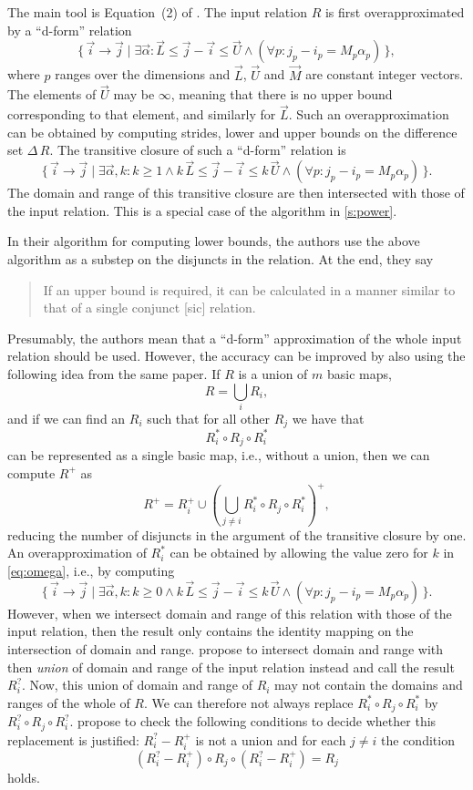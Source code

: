 The main tool is Equation~(2) of .
The input relation $R$ is first overapproximated by a ``d-form'' relation
$$
\{\, \vec i \to \vec j \mid \exists \vec \alpha :
\vec L \le \vec j - \vec i \le \vec U
\wedge
(\forall p : j_p - i_p = M_p \alpha_p)
\,\}
,
$$
where $p$ ranges over the dimensions and $\vec L$, $\vec U$ and
$\vec M$ are constant integer vectors.  The elements of $\vec U$
may be $\infty$, meaning that there is no upper bound corresponding
to that element, and similarly for $\vec L$.
Such an overapproximation can be obtained by computing strides,
lower and upper bounds on the difference set $\Delta \, R$.
The transitive closure of such a ``d-form'' relation is
\begin{equation}
\label{eq:omega}
\{\, \vec i \to \vec j \mid \exists \vec \alpha, k :
k \ge 1 \wedge
k \, \vec L \le \vec j - \vec i \le k \, \vec U
\wedge
(\forall p : j_p - i_p = M_p \alpha_p)
\,\}
.
\end{equation}
The domain and range of this transitive closure are then
intersected with those of the input relation.
This is a special case of the algorithm in \autoref{s:power}.

In their algorithm for computing lower bounds, the authors
use the above algorithm as a substep on the disjuncts in the relation.
At the end, they say
\begin{quote}
If an upper bound is required, it can be calculated in a manner
similar to that of a single conjunct [sic] relation.
\end{quote}
Presumably, the authors mean that a ``d-form'' approximation
of the whole input relation should be used.
However, the accuracy can be improved by also using the following
idea from the same paper.  If $R$ is a union of $m$ basic maps,
$$
R = \bigcup_i R_i
,
$$
and if we can find an $R_i$ such that for all other $R_j$ we have
that
$$
R_i^* \circ R_j \circ R_i^*
$$
can be represented as a single basic map, i.e., without a union,
then we can compute $R^+$ as
$$
R^+ = R_i^+ \cup
\left(
\bigcup_{j \ne i}
R_i^* \circ R_j \circ R_i^*
\right)^+
,
$$
reducing the number of disjuncts in the argument of the transitive
closure by one.
An overapproximation of $R_i^*$ can be obtained by
allowing the value zero for $k$ in \eqref{eq:omega},
i.e., by computing
$$
\{\, \vec i \to \vec j \mid \exists \vec \alpha, k :
k \ge 0 \wedge
k \, \vec L \le \vec j - \vec i \le k \, \vec U
\wedge
(\forall p : j_p - i_p = M_p \alpha_p)
\,\}
.
$$
However, when we intersect domain and range of this relation
with those of the input relation, then the result only contains
the identity mapping on the intersection of domain and range.
 propose to intersect domain
and range with then {\em union} of domain and range of the input
relation instead and call the result $R_i^?$.
Now, this union of domain and range of $R_i$ may not contain
the domains and ranges of the whole of $R$.
We can therefore not always replace
$R_i^* \circ R_j \circ R_i^*$ by
$R_i^? \circ R_j \circ R_i^?$.
 propose to check the following
conditions to decide whether this replacement is justified:
$R_i^? - R_i^+$ is not a union and for each $j \ne i$
the condition
$$
\left(R_i^? - R_i^+\right)
\circ
R_j
\circ
\left(R_i^? - R_i^+\right)
=
R_j
$$
holds.
